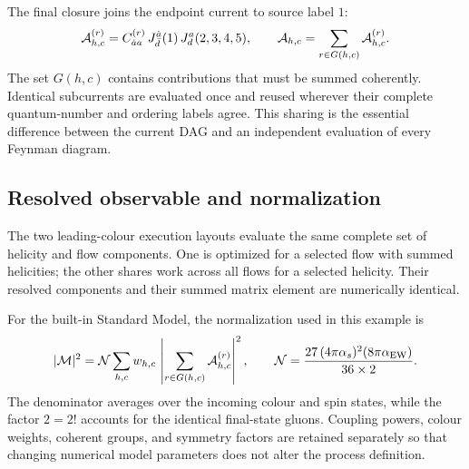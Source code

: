 The final closure joins the endpoint current to source label \(1\):
\begin{equation}
  {\cal A}_{h,c}^{(r)}
  =C^{(r)}_{\dot a a}\,
   J_{\bar d}^{\dot a}(1)\,
   J_d^a(2,3,4,5),
  \qquad
  {\cal A}_{h,c}=\sum_{r\in G(h,c)}{\cal A}_{h,c}^{(r)} .
  \label{eq:zgg-amplitude-root}
\end{equation}
The set \(G(h,c)\) contains contributions that must be summed coherently.
Identical subcurrents are evaluated once and reused wherever their complete
quantum-number and ordering labels agree.  This sharing is the essential
difference between the current DAG and an independent evaluation of every
Feynman diagram.

\subsection{Resolved observable and normalization}

The two leading-colour execution layouts evaluate the same complete set of
helicity and flow components.  One is optimized for a selected flow with summed helicities;
the other shares work across all flows for a selected helicity.  Their resolved
components and their summed matrix element are numerically identical.

For the built-in Standard Model, the normalization used in this example is
\begin{equation}
  |{\cal M}|^2
  ={\cal N}\sum_{h,c}w_{h,c}\,
     \left|\sum_{r\in G(h,c)}{\cal A}_{h,c}^{(r)}\right|^2,
  \qquad
  {\cal N}=\frac{27\,(4\pi\alpha_s)^2(8\pi\alpha_{\rm EW})}
                  {36\times2}.
  \label{eq:zgg-normalization}
\end{equation}
The denominator averages over the incoming colour and spin states, while the
factor \(2=2!\) accounts for the identical final-state gluons.  Coupling
powers, colour weights, coherent groups, and symmetry factors are retained
separately so that changing numerical model parameters does not alter the
process definition.
